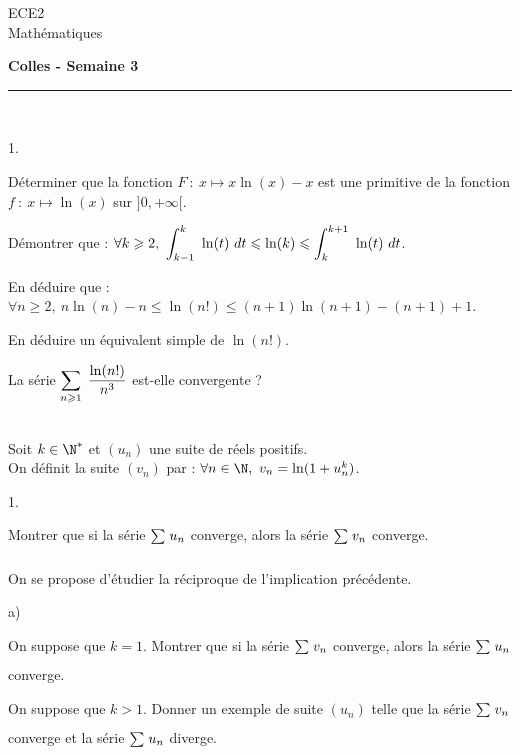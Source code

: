 \documentclass[11pt]{article}%
\begin{document}
\begin{flushleft}
ECE2 \\
Mathématiques
\end{flushleft}

\begin{center}
\textbf{\Large{Colles - Semaine 3}}
\end{center}

\hrule

\vspace*{0,2cm}


\begin{exercice}~
\begin{noliste}{1.}
\item Déterminer que la fonction $F \ : \ x \mapsto x \ln(x) -x$ est 
une primitive de la fonction $f \ : \ x \mapsto \ln(x)$ sur $]0, + 
\infty[$.
\item Démontrer que : $ \forall k \geq 2, \ \dint{k-1}{k} \ln(t) \dt 
\leq \ln(k) \leq \dint{k}{k+1} \ln(t) \dt$.
\item En déduire que : $\forall n \geq 2, \ n \ln(n) -n \leq \ln(n!) 
\leq (n+1)\ln(n+1) - (n+1) +1$.
\item En déduire un équivalent simple de $\ln(n!)$.
\item La série $ \displaystyle\sum\limits_{n \geqslant 1}^{}\hspace{.1cm} \dfrac{\ln(n!)}{n^3}$ est-elle 
convergente ?
\end{noliste}
\end{exercice}

\begin{exercice}~\\
Soit $ k \in \N^*$ et $(u_n)$ une suite de réels positifs.\\
On définit la suite $(v_n)$ par : $\forall n \in \N, \ v_n = \ln(1 + 
u_n^k)$.
\begin{noliste}{1.}
\item Montrer que si la série ${\textstyle\sum\limits_{}^{}}\hspace{.1cm} u_n$ converge, alors la série 
${\textstyle\sum\limits_{}^{}}\hspace{.1cm} v_n$ converge.
\item On se propose d'étudier la réciproque de l'implication précédente.
	\begin{noliste}{a)}
	\item On suppose que $k=1$. Montrer que si la série ${\textstyle\sum\limits_{}^{}}\hspace{.1cm} 
v_n$ converge, alors la série ${\textstyle\sum\limits_{}^{}}\hspace{.1cm} u_n$ converge.
	\item On suppose que $k>1$. Donner un exemple de suite $(u_n)$ 
telle que la série ${\textstyle\sum\limits_{}^{}}\hspace{.1cm} v_n$ converge et la série ${\textstyle\sum\limits_{}^{}}\hspace{.1cm} u_n$ 
diverge.
	\end{noliste}
\end{noliste}
\end{exercice}
\end{document}
